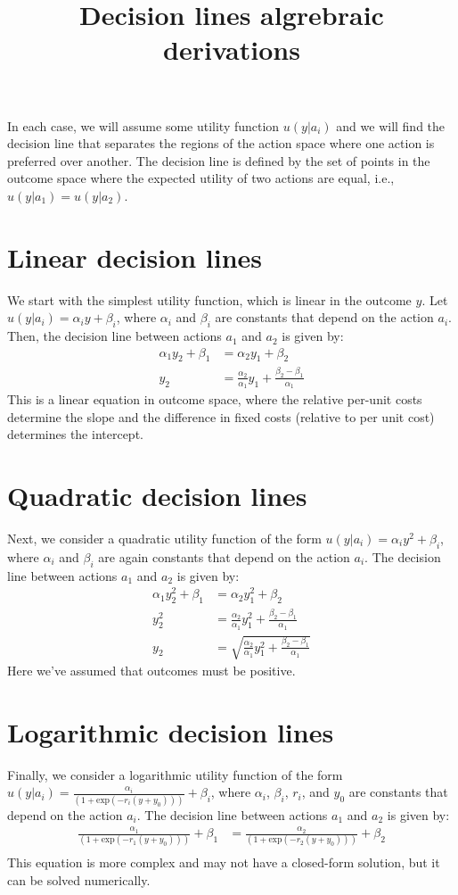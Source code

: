 \documentclass[12pt]{article}
\title{Decision lines algrebraic derivations}
\author{}
\date{}
\begin{document}
\maketitle

In each case, we will assume some utility function $u(y|a_i)$ and we will find the decision line that separates the regions of the action space where one action is preferred over another. The decision line is defined by the set of points in the outcome space where the expected utility of two actions are equal, i.e., $ u(y|a_1) = u(y|a_2) $.

\section{Linear decision lines}
We start with the simplest utility function, which is linear in the outcome $y$. Let $u(y|a_i) = \alpha_i y + \beta_i$, where $\alpha_i$ and $\beta_i$ are constants that depend on the action $a_i$. Then, the decision line between actions $a_1$ and $a_2$ is given by:
\begin{align*}
\alpha_1 y_2 + \beta_1 &= \alpha_2 y_1 + \beta_2 \\
y_2 &= \frac{\alpha_2}{\alpha_1} y_1 + \frac{\beta_2 - \beta_1}{\alpha_1}
\end{align*}
This is a linear equation in outcome space, where the relative per-unit costs determine the slope and the difference in fixed costs (relative to per unit cost) determines the intercept. 

\section{Quadratic decision lines}
Next, we consider a quadratic utility function of the form $u(y|a_i) = \alpha_i y^2 + \beta_i$, where $\alpha_i$ and $\beta_i$ are again constants that depend on the action $a_i$. The decision line between actions $a_1$ and $a_2$ is given by: 
\begin{align*}
\alpha_1 y_2^2 + \beta_1 &= \alpha_2 y_1^2 + \beta_2 \\
y_2^2 &= \frac{\alpha_2}{\alpha_1} y_1^2 + \frac{\beta_2 - \beta_1}{\alpha_1} \\
y_2 &= \sqrt{\frac{\alpha_2}{\alpha_1} y_1^2 + \frac{\beta_2 - \beta_1}{\alpha_1}}
\end{align*}
Here we've assumed that outcomes must be positive. 

\section{Logarithmic decision lines}
Finally, we consider a logarithmic utility function of the form $u(y|a_i) = \frac{\alpha_i}{(1+\text{exp}(-r_i(y+y_0)))} + \beta_i$, where $\alpha_i$, $\beta_i$, $r_i$, and $y_0$ are constants that depend on the action $a_i$. The decision line between actions $a_1$ and $a_2$ is given by:
\begin{align*}
\frac{\alpha_1}{(1+\text{exp}(-r_1(y+y_0)))} + \beta_1 &= \frac{\alpha_2}{(1+\text{exp}(-r_2(y+y_0)))} + \beta_2 \\
\end{align*}
This equation is more complex and may not have a closed-form solution, but it can be solved numerically. 
\end{document}
